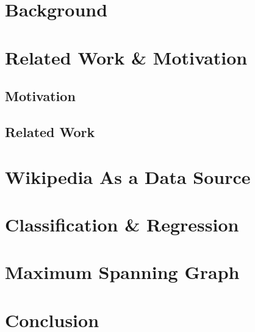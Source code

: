 \documentclass[bsc,frontabs,twoside,singlespacing,parskip,deptreport]{infthesis}     %
\begin{document}
\chapter{Background}


\chapter{Related Work \& Motivation}
\section{Motivation}
\section{Related Work}


\chapter{Wikipedia As a Data Source}

\chapter{Classification \& Regression}

\chapter{Maximum Spanning Graph}

\chapter{Conclusion}



\end{document}
